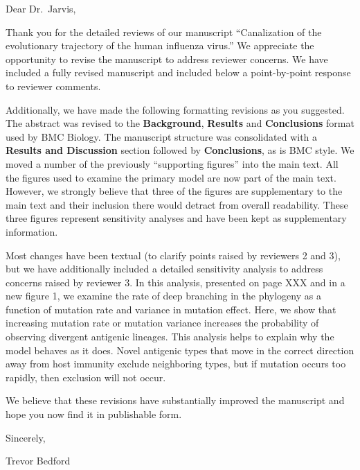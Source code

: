 \documentclass[11pt,oneside,letterpaper]{article}
\begin{document}
\setlength{\topmargin}{0.5in}
\thispagestyle{empty}

Dear Dr.\ Jarvis,

\vspace{0.5cm}

Thank you for the detailed reviews of our manuscript ``Canalization of the evolutionary trajectory of the human influenza virus.''  We appreciate the opportunity to revise the manuscript to address reviewer concerns.  We have included a fully revised manuscript and included below a point-by-point response to reviewer comments.

Additionally, we have made the following formatting revisions as you suggested.  The abstract was revised to the \textbf{Background}, \textbf{Results} and \textbf{Conclusions} format used by BMC Biology.  The manuscript structure was consolidated with a \textbf{Results and Discussion} section followed by \textbf{Conclusions}, as is BMC style.  We moved a number of the previously ``supporting figures'' into the main text.  All the figures used to examine the primary model are now part of the main text.  However, we strongly believe that three of the figures are supplementary to the main text and their inclusion there would detract from overall readability.  These three figures represent sensitivity analyses and have been kept as supplementary information.

Most changes have been textual (to clarify points raised by reviewers 2 and 3), but we have additionally included a detailed sensitivity analysis to address concerns raised by reviewer 3.  In this analysis, presented on page XXX and in a new figure 1, we examine the rate of deep branching in the phylogeny as a function of mutation rate and variance in mutation effect.  Here, we show that increasing mutation rate or mutation variance increases the probability of observing divergent antigenic lineages.  This analysis helps to explain why the model behaves as it does.  Novel antigenic types that move in the correct direction away from host immunity exclude neighboring types, but if mutation occurs too rapidly, then exclusion will not occur.

We believe that these revisions have substantially improved the manuscript and hope you now find it in publishable form.

\vspace{1cm}

Sincerely,

Trevor Bedford

\pagebreak
\end{document}
